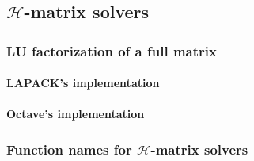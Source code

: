 \documentclass[11pt, a4paper]{article}
\begin{document}
\subsection{$\mathcal{H}$-matrix solvers}

\subsubsection{LU factorization of a full matrix}

\paragraph{LAPACK's implementation}

\paragraph{Octave's implementation}

\subsubsection{Function names for $\mathcal{H}$-matrix solvers}
\end{document}
